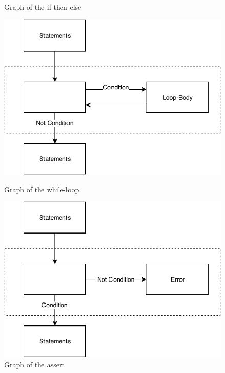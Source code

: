 \begin{figure}[ht]
\begin{minipage}[h]{0.45\textwidth}
    \caption{Graph of the if-then-else}
    \label{fig:cfg_if-else}
  \end{minipage}
  \newline \newline \vfill
  \begin{minipage}[h]{0.45\textwidth}
  	\centering
    \includegraphics[width=\textwidth]{images/while}
    \caption{Graph of the while-loop}
    \label{fig:cfg_while}
  \end{minipage}
  \hfill
  \begin{minipage}[h]{0.45\textwidth}
  	\centering
    \includegraphics[width=\textwidth]{images/assert}
    \caption{Graph of the assert}
    \label{fig:cfg_assert}
  \end{minipage}
\end{figure}


